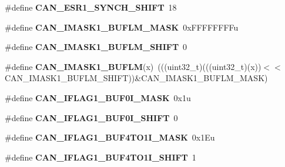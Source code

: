 \begin{DoxyCompactItemize}
\item 
\#define {\bfseries C\+A\+N\+\_\+\+E\+S\+R1\+\_\+\+S\+Y\+N\+C\+H\+\_\+\+S\+H\+I\+FT}~18\hypertarget{group__CAN__Register__Masks_ga2bd04d8052247b76f7bde4e6d936c0ac}{}\label{group__CAN__Register__Masks_ga2bd04d8052247b76f7bde4e6d936c0ac}

\item 
\#define {\bfseries C\+A\+N\+\_\+\+I\+M\+A\+S\+K1\+\_\+\+B\+U\+F\+L\+M\+\_\+\+M\+A\+SK}~0x\+F\+F\+F\+F\+F\+F\+F\+Fu\hypertarget{group__CAN__Register__Masks_ga1cb2f8a12349b014999ace58cd7600c6}{}\label{group__CAN__Register__Masks_ga1cb2f8a12349b014999ace58cd7600c6}

\item 
\#define {\bfseries C\+A\+N\+\_\+\+I\+M\+A\+S\+K1\+\_\+\+B\+U\+F\+L\+M\+\_\+\+S\+H\+I\+FT}~0\hypertarget{group__CAN__Register__Masks_gac50c90f8a89aa464399090953c634b8a}{}\label{group__CAN__Register__Masks_gac50c90f8a89aa464399090953c634b8a}

\item 
\#define {\bfseries C\+A\+N\+\_\+\+I\+M\+A\+S\+K1\+\_\+\+B\+U\+F\+LM}(x)~(((uint32\+\_\+t)(((uint32\+\_\+t)(x))$<$$<$C\+A\+N\+\_\+\+I\+M\+A\+S\+K1\+\_\+\+B\+U\+F\+L\+M\+\_\+\+S\+H\+I\+FT))\&C\+A\+N\+\_\+\+I\+M\+A\+S\+K1\+\_\+\+B\+U\+F\+L\+M\+\_\+\+M\+A\+SK)\hypertarget{group__CAN__Register__Masks_gad88c742e823f935e71682894123617b6}{}\label{group__CAN__Register__Masks_gad88c742e823f935e71682894123617b6}

\item 
\#define {\bfseries C\+A\+N\+\_\+\+I\+F\+L\+A\+G1\+\_\+\+B\+U\+F0\+I\+\_\+\+M\+A\+SK}~0x1u\hypertarget{group__CAN__Register__Masks_ga5d36a4819a3f3bf511cea99565f3e852}{}\label{group__CAN__Register__Masks_ga5d36a4819a3f3bf511cea99565f3e852}

\item 
\#define {\bfseries C\+A\+N\+\_\+\+I\+F\+L\+A\+G1\+\_\+\+B\+U\+F0\+I\+\_\+\+S\+H\+I\+FT}~0\hypertarget{group__CAN__Register__Masks_gae705acf892fbfc2484510abc75a3ef18}{}\label{group__CAN__Register__Masks_gae705acf892fbfc2484510abc75a3ef18}

\item 
\#define {\bfseries C\+A\+N\+\_\+\+I\+F\+L\+A\+G1\+\_\+\+B\+U\+F4\+T\+O1\+I\+\_\+\+M\+A\+SK}~0x1\+Eu\hypertarget{group__CAN__Register__Masks_ga1ea95efbf4b491b30529894ea5fd1e70}{}\label{group__CAN__Register__Masks_ga1ea95efbf4b491b30529894ea5fd1e70}

\item 
\#define {\bfseries C\+A\+N\+\_\+\+I\+F\+L\+A\+G1\+\_\+\+B\+U\+F4\+T\+O1\+I\+\_\+\+S\+H\+I\+FT}~1\hypertarget{group__CAN__Register__Masks_ga51d99b1c0de884a6dda6fba3e6826284}{}\label{group__CAN__Register__Masks_ga51d99b1c0de884a6dda6fba3e6826284}


\end{DoxyCompactItemize}
